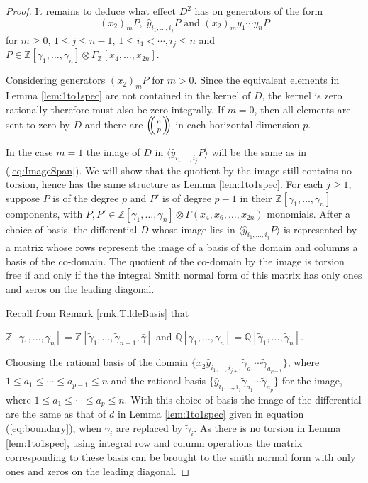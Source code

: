 \documentclass{article}
\theoremstyle{plain}
\theoremstyle{definition}
\numberwithin{thm}{section}
\begin{document}
\begin{proof}
				It remains to deduce what effect $D^2$ has on generators of the form
				\begin{equation*}
					(x_2)_m P, \; \hat{y}_{i_1,\dots,i_j}P \text{  and  } (x_2)_m y_1\cdots y_n P
				\end{equation*}
				for $m\geq 0$, $1\leq j\leq n-1$, $1\leq i_1<\cdots,i_j\leq n$ and
				$P\in\mathbb{Z}[\gamma_1,\dots,\gamma_n]\otimes\Gamma_\mathbb{Z}[x_4,\dots,x_{2n}]$.
				
				Considering generators $(x_2)_m P$ for $m>0$.
				Since the equivalent elements in Lemma \ref{lem:1to1spec} are not contained in the kernel of $D$,
				the kernel is zero rationally therefore must also be zero integrally.
				If $m=0$, then all elements are sent to zero by $D$ and there are ${\ensuremath{\left(\kern-.3em\left(\genfrac{}{}{0pt}{}{{n}}{{p}}\right)\kern-.3em\right)}}$ in each horizontal dimension $p$.
				
				In the case $m=1$ the image of $D$ in $\langle \hat{y}_{i_1,\dots,i_j}P\rangle$ will be the same as in (\ref{eq:ImageSpan}).
				We will show that the quotient by the image still contains no torsion, hence has the same structure as Lemma \ref{lem:1to1spec}.
				For each $j\geq 1$, suppose $P$ is of the degree $p$ and $P'$ is of degree $p-1$ in their $\mathbb{Z}[\gamma_1,\dots,\gamma_n]$ components,
				with $P,P'\in \mathbb{Z}[\gamma_1,\dots,\gamma_{n}]\otimes\Gamma(x_4,x_6,\dots,x_{2n})$ monomials.
				After a choice of basis, the differential $D$ whose image lies in $\langle \hat{y}_{i_1,\dots,i_j}P\rangle$
				is represented by a matrix whose rows represent the image of a basis of the domain and columns a basis of the co-domain. 
				The quotient of the co-domain by the image is torsion free if and only if the the integral Smith normal form of this matrix
				has only ones and zeros on the leading diagonal.
				
				Recall from Remark \ref{rmk:TildeBasis} that 
				\begin{center}
					$\mathbb{Z}[\gamma_1,\dots,\gamma_{n}]=\mathbb{Z}[\tilde{\gamma}_1,\dots,\tilde{\gamma}_{n-1},\bar{\gamma}]$ and
					$\mathbb{Q}[\gamma_1,\dots,\gamma_{n}]=\mathbb{Q}[\tilde{\gamma}_1,\dots,\tilde{\gamma}_{n}]$.
				\end{center}
				
				Choosing the rational basis of the domain $\{x_2 \hat{y}_{i_{1},\dots,i_{j+1}}\tilde{\gamma}_{a_1}\cdots\tilde{\gamma}_{a_{p-1}} \}$,
				where $1\leq a_1\leq \cdots \leq a_{p-1} \leq n$
				and the rational basis $\{ \hat{y}_{i_{1},\dots,i_{j}}\tilde{\gamma}_{a_1}\cdots \tilde{\gamma}_{a_{p}} \}$ for the image,
				where $1\leq a_1\leq \cdots \leq a_{p} \leq n$.
				With this choice of basis the image of the differential are the same as that of ${d}$ in Lemma \ref{lem:1to1spec} given in equation (\ref{eq:boundary}),
				when $\gamma_i$ are replaced by $\tilde{\gamma}_i$.
				As there is no torsion in Lemma \ref{lem:1to1spec},
				using integral row and column operations the matrix corresponding to these basis can be brought to the smith normal form
				with only ones and zeros on the leading diagonal.
				

\end{proof}
\end{document}
